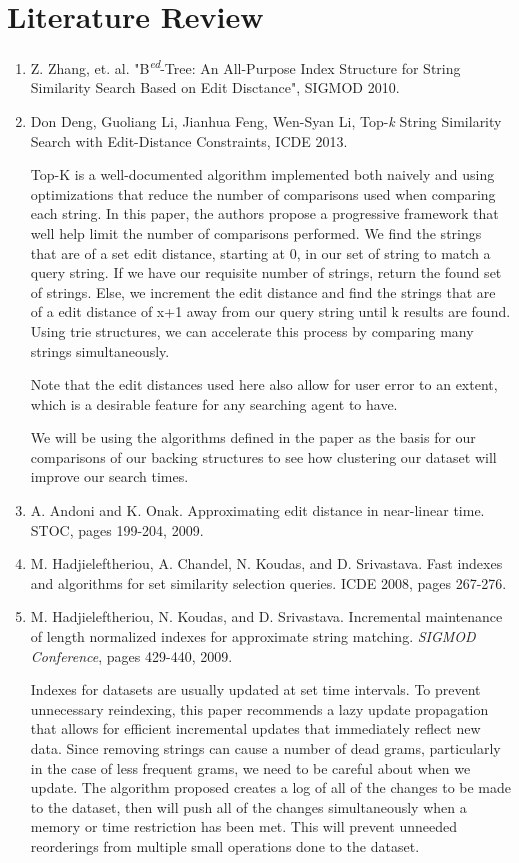 \documentclass[pdftex,12pt,letter]{article}
\begin{document}
\section{Literature Review}
\begin{enumerate}
\item Z. Zhang, et. al. "B\textsuperscript{\textit{ed}}-Tree: An All-Purpose Index Structure for String Similarity Search Based on Edit Disctance", SIGMOD 2010.
\item Don Deng, Guoliang Li, Jianhua Feng, Wen-Syan Li, Top-\textit{k} String Similarity Search with Edit-Distance Constraints, ICDE 2013.

	Top-K is a well-documented algorithm implemented both naively and using optimizations that reduce the number of comparisons used when comparing each string. In this paper, the authors propose a progressive framework that well help limit the number of comparisons performed. We find the strings that are of a set edit distance, starting at 0, in our set of string to match a query string. If we have our requisite number of strings, return the found set of strings. Else, we increment the edit distance and find the strings that are of a edit distance of x+1 away from our query string until k results are found. Using trie structures, we can accelerate this process by comparing many strings simultaneously.

	Note that the edit distances used here also allow for user error to an extent, which is a desirable feature for any searching agent to have. 

	We will be using the algorithms defined in the paper as the basis for our comparisons of our backing structures to see how clustering our dataset will improve our search times. 

\item A. Andoni and K. Onak. Approximating edit distance in near-linear time. STOC, pages 199-204, 2009.
\item M. Hadjieleftheriou, A. Chandel, N. Koudas, and D. Srivastava. Fast indexes and algorithms for set similarity selection queries. ICDE 2008, pages 267-276.
\item M. Hadjieleftheriou, N. Koudas, and D. Srivastava. Incremental maintenance of length normalized indexes for approximate string matching. \textit{SIGMOD Conference}, pages 429-440, 2009.

Indexes for datasets are usually updated at set time intervals. To prevent unnecessary reindexing, this paper recommends a lazy update propagation that allows for efficient incremental updates that immediately reflect new data.  Since removing strings can cause a number of dead grams, particularly in the case of less frequent grams, we need to be careful about when we update. The algorithm proposed creates a log of all of the changes to be made to the dataset, then will push all of the changes simultaneously when a memory or time restriction has been met. This will prevent unneeded reorderings from multiple small operations done to the dataset. 


\end{enumerate}
\end{document}
